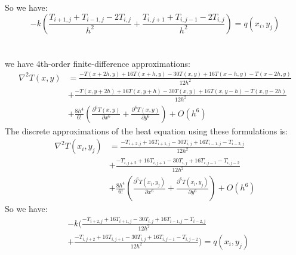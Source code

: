 \documentclass{article}
\begin{document}
So we have:
\[
-k(\frac{T_{i+1,j} + T_{i-1,j} - 2T_{i, j}}{h^2} + \frac{T_{i, j+1} + T_{i, j-1} - 2T_{i, j}}{h^2}) = q(x_i, y_j)
\]\\ \\
we have 4th-order finite-difference approximations:
\[
\begin{split}
{\nabla}^2{T(x, y)}  &= \frac{- T(x+2h, y) + 16T(x+h, y) - 30T(x, y) + 16T(x-h, y) - T(x-2h, y)}{12h^2}\\
                              &+ \frac{- T(x, y+2h) + 16T(x, y+h) - 30T(x, y) + 16T(x, y-h) - T(x, y-2h)}{12h^2}\\
                              &+ \frac{8h^4}{6!}(\frac{\partial^6 T(x, y)}{\partial x^6} + \frac{\partial^6 T(x, y)}{\partial y^6})  + O(h^6)
\end{split}
\]
The discrete approximations of the heat equation using these formulations is:
\[
\begin{split}
{\nabla}^2{T(x_i, y_j)} &= \frac{- T_{i+2, j} + 16T_{i+1, j} - 30T_{i, j} + 16T_{i-1, j} - T_{i-2, j}}{12h^2}\\
                                   &+ \frac{- T_{i, j+2} + 16T_{i, j+1} - 30T_{i, j} + 16T_{i, j-1} - T_{i, j-2}}{12h^2}\\
                                   &+ \frac{8h^4}{6!}(\frac{\partial^6 T(x_i, y_j)}{\partial x^6} + \frac{\partial^6 T(x_i, y_j)}{\partial y^6})  + O(h^6)
\end{split}
\]
So we have:
\[
\begin{split}
&-k(\frac{- T_{i+2, j} + 16T_{i+1, j} - 30T_{i, j} + 16T_{i-1, j} - T_{i-2, j}}{12h^2}\\
&+ \frac{- T_{i, j+2} + 16T_{i, j+1} - 30T_{i, j} + 16T_{i, j-1} - T_{i, j-2}}{12h^2})= q(x_i, y_j)
\end{split}
\]
\end{document}

